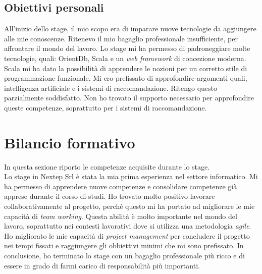 \subsection{Obiettivi personali}
All'inizio dello stage, il mio scopo era di imparare nuove tecnologie da aggiungere alle mie conoscenze. Ritenevo il mio bagaglio professionale insufficiente, per affrontare il mondo del lavoro. Lo stage mi ha permesso di padroneggiare molte tecnologie, quali: OrientDb, Scala e un \emph{web framework} di concezione moderna. Scala mi ha dato la possibilità di apprendere le nozioni per un corretto stile di programmazione funzionale. Mi ero prefissato di approfondire argomenti quali, intelligenza artificiale e i sistemi di raccomandazione. Ritengo questo parzialmente soddisfatto. Non ho trovato il supporto necessario per approfondire queste competenze, soprattutto per i sistemi di raccomandazione.




\section{Bilancio formativo}
In questa sezione riporto le competenze acquisite durante lo stage.\\
Lo stage in Nextep Srl è stata la  mia prima esperienza nel settore informatico. Mi ha permesso di apprendere nuove competenze e consolidare competenze già apprese durante il corso di studi.
Ho trovato molto positivo lavorare collaborativamente al progetto, perché questo mi ha portato ad migliorare le mie capacità di \emph{team working}. Questa abilità è molto importante nel mondo del lavoro, soprattutto nei contesti lavorativi dove si utilizza una metodologia \emph{agile}. Ho migliorato le mie capacità di \emph{project management} per concludere il progetto nei tempi fissati e raggiungere gli obbiettivi minimi che mi sono prefissato. In conclusione, ho terminato lo stage con un bagaglio professionale più ricco e di essere in grado di farmi carico di responsabilità più importanti.
\newpage
